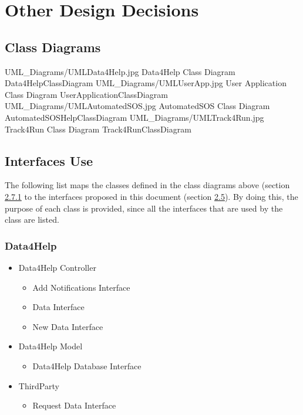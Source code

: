 \documentclass[../../DD.tex]{subfiles}
\begin{document}
\section{Other Design Decisions}
	\subsection{Class Diagrams\label{sect:2.7.1}}
	\image {13cm} {UML_Diagrams/UMLData4Help.jpg} {Data4Help Class Diagram} {Data4HelpClassDiagram}
	\image {13cm} {UML_Diagrams/UMLUserApp.jpg} {User Application Class Diagram} {UserApplicationClassDiagram}
	\image {13cm} {UML_Diagrams/UMLAutomatedSOS.jpg} {AutomatedSOS Class Diagram} {AutomatedSOSHelpClassDiagram}
	\image {13cm} {UML_Diagrams/UMLTrack4Run.jpg} {Track4Run Class Diagram} {Track4RunClassDiagram}
	
	\newpage
	
	\subsection{Interfaces Use}
		The following list maps the classes defined in the class diagrams above (section \hyperref[sect:2.7.1]{2.7.1} to the interfaces proposed in this document (section \hyperref[sect:2.5]{2.5}). By doing this, the purpose of each class is provided, since all the interfaces that are used by the class are listed.
		\subsubsection{Data4Help}
		
		\begin{itemize}
			\item Data4Help Controller
			\begin{itemize}
				\item Add Notifications Interface
				\item Data Interface
				\item New Data Interface
			\end{itemize}
			\item Data4Help Model
			\begin{itemize}
				\item Data4Help Database Interface
			\end{itemize}
			\item ThirdParty
			\begin{itemize}
				\item Request Data Interface
			\end{itemize}
		\end{itemize}
\end{document}

